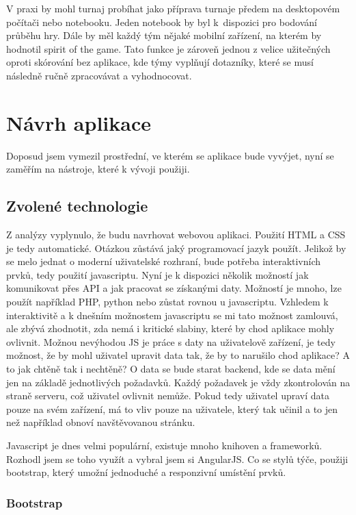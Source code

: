 \documentclass[thesis=B,czech]{FITthesis}[2012/06/26]
\begin{document}
		V praxi by mohl turnaj probíhat jako příprava turnaje předem na desktopovém počítači nebo notebooku. Jeden notebook by byl k~dispozici pro bodování průběhu hry. Dále by měl každý tým nějaké mobilní zařízení, na kterém by hodnotil spirit of the game. Tato funkce je zároveň jednou z velice užitečných oproti skórování bez aplikace, kde týmy vyplňují dotazníky, které se musí následně ručně zpracovávat a vyhodnocovat.


\chapter{Návrh aplikace}
	Doposud jsem vymezil prostřední, ve kterém se aplikace bude vyvýjet, nyní se zaměřím na nástroje, které k vývoji použiji.


	\section{Zvolené technologie}
		Z analýzy vyplynulo, že budu navrhovat webovou aplikaci. Použití HTML a CSS je tedy automatické. Otázkou zůstává jaký programovací jazyk použít. Jelikož by se melo jednat o moderní uživatelské rozhraní, bude potřeba interaktivních prvků, tedy použití javascriptu. Nyní je k dispozici několik možností jak komunikovat přes API a jak pracovat se získanými daty. Možností je mnoho, lze použít například PHP, python nebo zůstat rovnou u javascriptu. Vzhledem k interaktivitě a k dnešním možnostem javascriptu se mi tato možnost zamlouvá, ale zbývá zhodnotit, zda nemá i kritické slabiny, které by chod aplikace mohly ovlivnit. Možnou nevýhodou JS je práce s daty na uživatelově zařízení, je tedy možnost, že by mohl uživatel upravit data tak, že by to narušilo chod aplikace? A to jak chtěně tak i nechtěně? O data se bude starat backend, kde se data mění jen na základě jednotlivých požadavků. Každý požadavek je vždy zkontrolován na straně serveru, což uživatel ovlivnit nemůže. Pokud tedy uživatel upraví data pouze na svém zařízení, má to vliv pouze na uživatele, který tak učinil a to jen než například obnoví navštěvovanou stránku.

		Javascript je dnes velmi populární, existuje mnoho knihoven a frameworků. Rozhodl jsem se toho využít a vybral jsem si AngularJS. Co se stylů týče, použiji bootstrap, který umožní jednoduché a responzivní umístění prvků.

		\subsection{Bootstrap}
		
\end{document}
